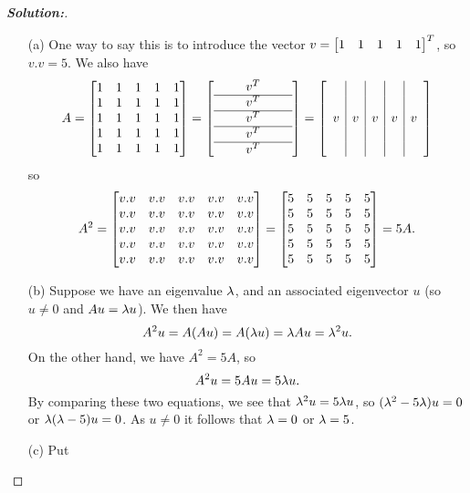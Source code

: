\documentclass[a4paper]{amsart}
\theoremstyle{definition}
\newenvironment{solution}{\begin{proof}[\textbf{Solution:}] \vphantom{u}}{\end{proof}}
\begin{document}
\begin{solution}
 \begin{itemize}
  \item[(a)] One way to say this is to introduce the vector
   $v=\left[\begin{matrix} 1&1&1&1&1\end{matrix}\right]^T$, so $v.v=5$.  We also have
   \[
    A = \left[\begin{matrix} 1&1&1&1& 1 \\1&1&1&1& 1 \\1&1&1&1& 1 \\1&1&1&1& 1 \\1&1&1&1& 1 \end{matrix}\right]
      = \left[\begin{array}{ccccc} 
         && v^T && \\ \hline
         && v^T && \\ \hline
         && v^T && \\ \hline
         && v^T && \\ \hline
         && v^T && 
        \end{array}\right] 
      = \left[\begin{array}{c|c|c|c|c}
         &&&& \\ &&&& \\ v & v & v & v & v \\ &&&& \\ &&&&
        \end{array}\right]
   \]
   so 
   \[ A^2 = \left[\begin{matrix} v.v & v.v & v.v & v.v & v.v \\
                 v.v & v.v & v.v & v.v & v.v \\
                 v.v & v.v & v.v & v.v & v.v \\
                 v.v & v.v & v.v & v.v & v.v \\
                 v.v & v.v & v.v & v.v & v.v \end{matrix}\right] 
          = \left[\begin{matrix} 5 & 5 & 5 & 5 & 5 \\
                 5 & 5 & 5 & 5 & 5 \\
                 5 & 5 & 5 & 5 & 5 \\
                 5 & 5 & 5 & 5 & 5 \\
                 5 & 5 & 5 & 5 & 5 \end{matrix}\right] = 5A.
   \]
  \item[(b)] Suppose we have an eigenvalue $\lambda$, and an associated
   eigenvector $u$ (so $u\neq 0$ and $Au=\lambda u$).  We then have
   \[ A^2u = A(Au) = A(\lambda u) = \lambda Au = \lambda^2 u. \]
   On the other hand, we have $A^2=5A$, so 
   \[ A^2u = 5Au = 5\lambda u. \]
   By comparing these two equations, we see that $\lambda^2u=5\lambda u$, so
   $(\lambda^2-5\lambda)u=0$ or $\lambda(\lambda-5)u=0$.  As $u\neq 0$ it follows that
   $\lambda=0$ or $\lambda=5$.
  \item[(c)] Put 

\end{itemize}
\end{solution}
\end{document}
